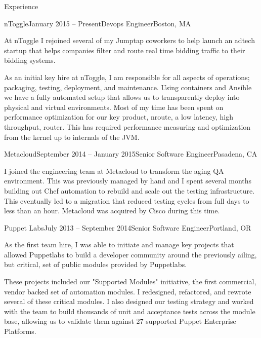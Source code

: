 \documentclass{resume} %
\begin{document}

\begin{rSection}{Experience}

\begin{rSubsection}{nToggle}{January 2015 -- Present}{Devops Engineer}{Boston, MA}
\item[] At nToggle I rejoined several of my Jumptap coworkers to help launch an adtech startup that helps companies filter and route real time bidding traffic to their bidding systems.

As an initial key hire at nToggle, I am responsible for all aspects of operations; packaging, testing, deployment, and maintenance.  Using containers and Ansible we have a fully automated setup that allows us to transparently deploy into physical and virtual environments.  Most of my time has been spent on performance optimization for our key product, nroute,  a low latency, high throughput, router.  This has required performance measuring and optimization from the kernel up to internals of the JVM.
\end{rSubsection}

\begin{rSubsection}{Metacloud}{September 2014 -- January 2015}{Senior Software Engineer}{Pasadena, CA}
\item[] I joined the engineering team at Metacloud to transform the aging QA environment.  This was previously managed by hand and I spent several months building out Chef automation to rebuild and scale out the testing infrastructure.  This eventually led to a migration that reduced testing cycles from full days to less than an hour.  Metacloud was acquired by Cisco during this time.
\end{rSubsection}

\begin{rSubsection}{Puppet Labs}{July 2013 -- September 2014}{Senior Software Engineer}{Portland, OR}
\item[] As the first team hire, I was able to initiate and manage key projects that allowed Puppetlabs to build a developer community around the previously ailing, but critical, set of public modules provided by Puppetlabs.

These projects included our "Supported Modules" initiative, the first commercial, vendor backed set of  automation modules.  I redesigned, refactored, and rewrote several of these critical modules.  I also designed our testing strategy and worked with the team to build thousands of unit and acceptance tests across the module base, allowing us to validate them against 27 supported Puppet Enterprise Platforms.


\end{rSubsection}
\end{rSection}
\end{document}
